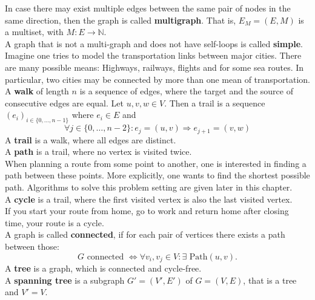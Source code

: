             In case there may exist multiple edges between the same pair of nodes in the same direction, then the graph is called \textbf{multigraph}. 
            That is, $E_M = (E, M)$ is a multiset, with $M: E \rightarrow \mathbb{N}$. \\
            A graph that is not a multi-graph and does not have self-loops is called \textbf{simple}. \\
            
            Imagine one tries to model the transportation links between major cities. 
            There are many possible means: Highways, railways, flights and for some sea routes. 
            In particular, two cities may be connected by more than one mean of transportation.\\
            
            A \textbf{walk} of length $n$ is a sequence of edges, where the target and the source of consecutive edges are equal. Let $u,v,w \in V$. Then a trail is a sequence $(e_i)_{i \in \{0, \dots, n-1\}}$ where $e_i \in E$ and
            \[ \forall j \in \{0, \dots, n-2\}: e_j = (u, v) \Rightarrow e_{j+1} = (v, w)\] 
            A \textbf{trail} is a walk, where all edges are distinct. \\
            A \textbf{path} is a trail, where no vertex is visited twice.\\
            
            When planning a route from some point to another, one is interested in finding a path between these points.
            More explicitly, one wants to find the shortest possible path. 
            Algorithms to solve this problem setting are given later in this chapter. \\
            
            A \textbf{cycle} is a trail, where the first visited vertex is also the last visited vertex. \\
            If you start your route from home, go to work and return home after closing time, your route is a cycle.\\
            
            A graph is called \textbf{connected}, if for each pair of vertices there exists a path between those: 
            \[G \text{ connected } \Leftrightarrow \forall v_i, v_j \in V: \exists \text{ Path}(u, v).\]
            A \textbf{tree} is a graph, which is connected and cycle-free. \\
            A \textbf{spanning tree} is a subgraph $G' = (V', E')$ of $G = (V, E)$, that is a tree and $V' = V$. \\
            
